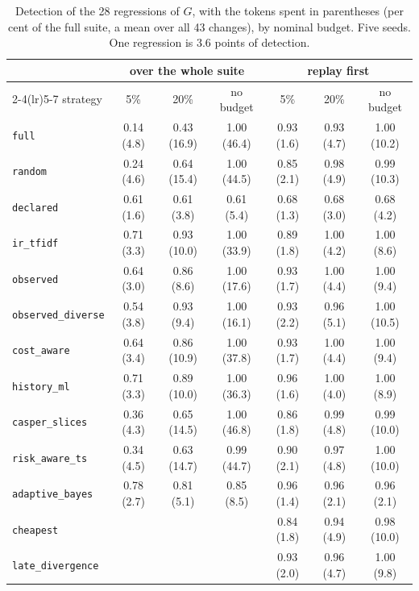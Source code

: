 \documentclass[11pt,a4paper]{article}
\newcommand{\strat}[1]{\texttt{#1}}
\begin{document}
\begin{table}[!htbp]
\centering\small
\caption{Detection of the 28 regressions of $G$, with the tokens spent in parentheses (per cent of the full suite,
a mean over all 43 changes), by nominal budget. Five seeds. One regression is 3.6 points of detection.}
\label{tab:cost}
\setlength{\tabcolsep}{4pt}
\begin{tabular}{lcccccc}
\toprule
 & \multicolumn{3}{c}{over the whole suite} & \multicolumn{3}{c}{replay first} \\
\cmidrule(lr){2-4}\cmidrule(lr){5-7}
strategy & 5\% & 20\% & no budget & 5\% & 20\% & no budget \\
\midrule
\strat{full}                 & 0.14 (4.8) & 0.43 (16.9) & 1.00 (46.4) & 0.93 (1.6) & 0.93 (4.7) & 1.00 (10.2) \\
\strat{random}               & 0.24 (4.6) & 0.64 (15.4) & 1.00 (44.5) & 0.85 (2.1) & 0.98 (4.9) & 0.99 (10.3) \\
\strat{declared}             & 0.61 (1.6) & 0.61 (3.8) & 0.61 (5.4) & 0.68 (1.3) & 0.68 (3.0) & 0.68 (4.2) \\
\strat{ir\_tfidf}            & 0.71 (3.3) & 0.93 (10.0) & 1.00 (33.9) & 0.89 (1.8) & 1.00 (4.2) & 1.00 (8.6) \\
\strat{observed}             & 0.64 (3.0) & 0.86 (8.6) & 1.00 (17.6) & 0.93 (1.7) & 1.00 (4.4) & 1.00 (9.4) \\
\strat{observed\_diverse}    & 0.54 (3.8) & 0.93 (9.4) & 1.00 (16.1) & 0.93 (2.2) & 0.96 (5.1) & 1.00 (10.5) \\
\strat{cost\_aware}          & 0.64 (3.4) & 0.86 (10.9) & 1.00 (37.8) & 0.93 (1.7) & 1.00 (4.4) & 1.00 (9.4) \\
\strat{history\_ml}          & 0.71 (3.3) & 0.89 (10.0) & 1.00 (36.3) & 0.96 (1.6) & 1.00 (4.0) & 1.00 (8.9) \\
\strat{casper\_slices}       & 0.36 (4.3) & 0.65 (14.5) & 1.00 (46.8) & 0.86 (1.8) & 0.99 (4.8) & 0.99 (10.0) \\
\strat{risk\_aware\_ts}      & 0.34 (4.5) & 0.63 (14.7) & 0.99 (44.7) & 0.90 (2.1) & 0.97 (4.8) & 1.00 (10.0) \\
\strat{adaptive\_bayes}      & 0.78 (2.7) & 0.81 (5.1) & 0.85 (8.5) & 0.96 (1.4) & 0.96 (2.1) & 0.96 (2.1) \\
\strat{cheapest}             &  &  &  & 0.84 (1.8) & 0.94 (4.9) & 0.98 (10.0) \\
\strat{late\_divergence}     &  &  &  & 0.93 (2.0) & 0.96 (4.7) & 1.00 (9.8) \\
\bottomrule
\end{tabular}
\end{table}
\end{document}
